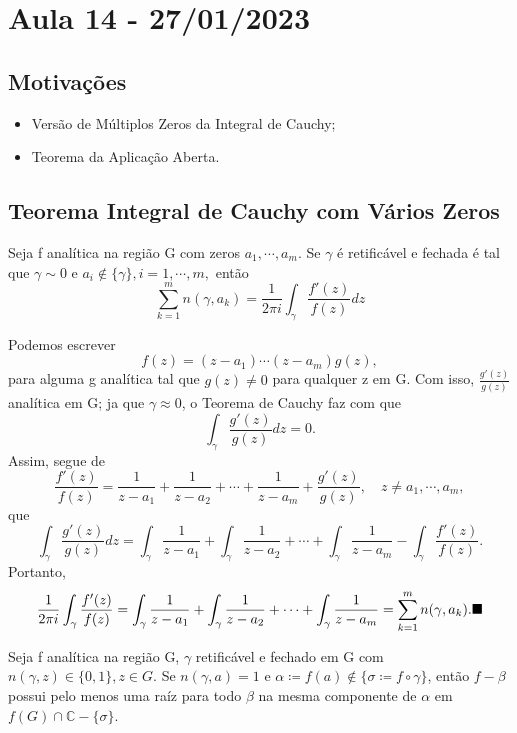 \documentclass[ComplexAnalysis/complex.tex]{subfiles}
\begin{document}
\section{Aula 14 - 27/01/2023}
\subsection{Motivações}
\begin{itemize}
	\item Versão de Múltiplos Zeros da Integral de Cauchy;
	\item Teorema da Aplicação Aberta.
\end{itemize}

\subsection{Teorema Integral de Cauchy com Vários Zeros}
\hypertarget{zeros_cauchy}{\begin{theorem*}
		Seja f analítica na região G com zeros $a_{1}, \cdots, a_{m}.$ Se $\gamma$ é retificável e fechada é tal que $\gamma\sim0$
		e $a_{i}\not\in \{\gamma\}, i = 1, \cdots, m, $ então
		$$
			\sum\limits_{k=1}^{m}n(\gamma, a_{k}) = \frac{1}{2\pi i}\int_{\gamma}^{}\frac{f'(z)}{f(z)}dz
		$$
	\end{theorem*}}
\begin{proof*}
	Podemos escrever
	$$
		f(z) = (z-a_{1})\cdots(z-a_{m})g(z),
	$$
	para alguma g analítica tal que $g(z)\neq0$ para qualquer z em G. Com isso, $\displaystyle \frac{g'(z)}{g(z)}$ analítica em G;
	ja que $\gamma\approx0$, o Teorema de Cauchy faz com que
	$$
		\int_{\gamma}^{}\frac{g'(z)}{g(z)}dz = 0.
	$$
	Assim, segue de
	$$
		\frac{f'(z)}{f(z)} = \frac{1}{z-a_{1}} + \frac{1}{z-a_{2}} + \cdots + \frac{1}{z-a_{m}} + \frac{g'(z)}{g(z)},\quad z\neq a_{1}, \cdots, a_{m},
	$$
	que
	$$
		\int_{\gamma}^{}\frac{g'(z)}{g(z)}dz = \int_{\gamma}^{}\frac{1}{z-a_{1}} + \int_{\gamma}^{}\frac{1}{z-a_{2}} + \cdots + \int_{\gamma}^{}\frac{1}{z-a_{m}} - \int_{\gamma}^{}\frac{f'(z)}{f(z)}.
	$$
	Portanto,
	$$
		\frac{1}{2\pi i}\int_{\gamma}^{}\frac{f'(z)}{f(z)} = \int_{\gamma}^{}\frac{1}{z-a_{1}} + \int_{\gamma}^{}\frac{1}{z-a_{2}} + \cdots + \int_{\gamma}^{}\frac{1}{z-a_{m}} = \sum\limits_{k=1}^{m}n(\gamma, a_{k}).\text{$\blacksquare$}
	$$
\end{proof*}
\begin{prop*}
	Seja f analítica na região G, $\gamma$ retificável e fechado em G com $n(\gamma, z)\in \{0, 1\}, z\in{G}.$ Se $n(\gamma, a) = 1$
	e $\alpha\coloneqq  f(a)\not\in \{\sigma\coloneqq  f\circ{\gamma}\} $, então $f-\beta$ possui pelo menos uma raíz para todo $\beta$ na mesma componente
	de $\alpha$ em $f(G)\cap{\mathbb{C}-\{\sigma\}}$.
\end{prop*}
\end{document}
